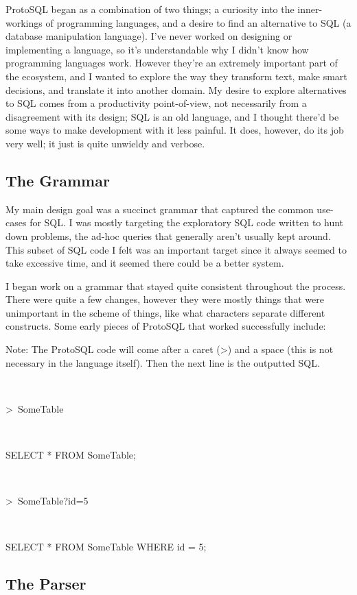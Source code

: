 \documentclass[titlepage]{article}
\begin{document}
		ProtoSQL began as a combination of two things; a curiosity into the inner-workings of programming languages, and a desire to find an alternative to SQL (a database manipulation language).  I've never worked on designing or implementing a language, so it's understandable why I didn't know how programming languages work.  However they're an extremely important part of the ecosystem, and I wanted to explore the way they transform text, make smart decisions, and translate it into another domain.  My desire to explore alternatives to SQL comes from a productivity point-of-view, not necessarily from a disagreement with its design; SQL is an old language, and I thought there'd be some ways to make development with it less painful.  It does, however, do its job very well; it just is quite unwieldy and verbose.

		\subsection{The Grammar}

			My main design goal was a succinct grammar that captured the common use-cases for SQL.  I was mostly targeting the exploratory SQL code written to hunt down problems, the ad-hoc queries that generally aren't usually kept around.  This subset of SQL code I felt was an important target since it always seemed to take excessive time, and it seemed there could be a better system.

			I began work on a grammar that stayed quite consistent throughout the process.  There were quite a few changes, however they were mostly things that were unimportant in the scheme of things, like what characters separate different constructs.  Some early pieces of ProtoSQL that worked successfully include:
			\newline

			Note: The ProtoSQL code will come after a caret (\textgreater) and a space (this is not necessary in the language itself).  Then the next line is the outputted SQL.

			~\centerline{\textgreater\ SomeTable}
			~\centerline{SELECT * FROM SomeTable;}
			\newline

			~\centerline{\textgreater\ SomeTable?id=5}
			~\centerline{SELECT * FROM SomeTable WHERE id = 5;}
			\newline

		\subsection{The Parser}
\end{document}
